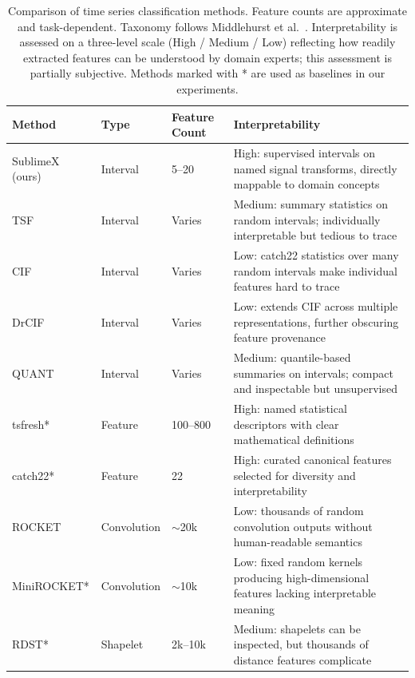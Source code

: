 \documentclass[times, review, 10pt]{elsarticle}
\begin{document}
\begin{table}[H]
\centering
\caption{Comparison of time series classification methods.
Feature counts are approximate and task-dependent. Taxonomy
follows Middlehurst et al.\ \cite{middlehurst2024bakeoff}.
Interpretability is assessed on a three-level scale (High /
Medium / Low) reflecting how readily extracted features can be
understood by domain experts; this assessment is partially
subjective. Methods marked with * are used as baselines in our
experiments.}
\label{tab:feature_toolkits}
\tiny
\renewcommand{\arraystretch}{0.95}
\begin{tabularx}{\textwidth}
  {@{}p{1.5cm}p{1.1cm}p{1.1cm}X@{}}
\toprule
\textbf{Method} & \textbf{Type} &
\textbf{Feature Count} &
\textbf{Interpretability} \\
\midrule
SublimeX (ours) & Interval & 5--20 &
High: supervised intervals on named signal
transforms, directly mappable to domain concepts \\
TSF \cite{deng2013tsf} & Interval &
Varies &
Medium: summary statistics on random
intervals; individually interpretable but tedious to trace \\
CIF \cite{middlehurst2020cif} & Interval &
Varies &
Low: catch22 statistics over many random intervals
make individual features hard to trace \\
DrCIF \cite{middlehurst2021hivecote2} & Interval &
Varies &
Low: extends CIF across multiple representations,
further obscuring feature provenance \\
QUANT \cite{dempster2024quant} & Interval &
Varies &
Medium: quantile-based summaries on intervals;
compact and inspectable but unsupervised \\
\midrule
tsfresh* \cite{christ2018tsfresh} & Feature &
100--800 &
High: named statistical descriptors with clear
mathematical definitions \\
catch22* \cite{lubba2019catch22} & Feature &
22 &
High: curated canonical features selected for
diversity and interpretability \\
\midrule
ROCKET \cite{dempster2020rocket} & Convolution &
$\sim$20k &
Low: thousands of random convolution outputs
without human-readable semantics \\
MiniROCKET* \cite{dempster2021minirocket} & Convolution &
$\sim$10k &
Low: fixed random kernels producing
high-dimensional features lacking interpretable
meaning \\
\midrule
RDST* \cite{guillaume2022random} & Shapelet &
2k--10k &
Medium: shapelets can be inspected, but
thousands of distance features complicate

\end{tabularx}
\end{table}
\end{document}
